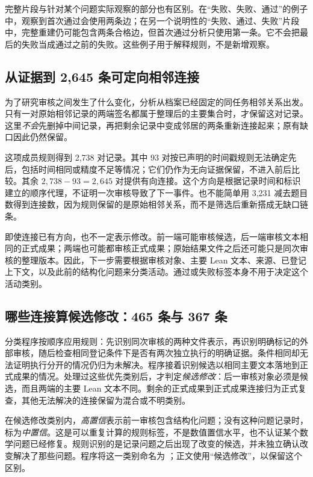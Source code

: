 完整片段与针对某个问题实际观察的部分也有区别。在“失败、失败、通过”的例子中，观察到首次通过会使用两条边；在另一个说明性的“失败、通过、失败”片段中，完整重建仍可能包含两条合格边，但首次通过分析只使用第一条。它不会把最后的失败当成通过之前的失败。这些例子用于解释规则，不是新增观察。

\subsection{从证据到 2,645 条可定向相邻连接}
\label{subsec:adjacency}
为了研究审核之间发生了什么变化，分析从档案已经固定的同任务相邻关系出发。只有一对原始相邻记录的两端签名都属于整理后的主要集合时，才保留这对记录。这里\emph{不会}先删掉中间记录，再把剩余记录中变成邻居的两条重新连接起来；原有缺口因此仍然保留。

这项成员规则得到 2,738 对记录。其中 93 对按已声明的时间戳规则无法确定先后，包括时间相同或精度不足等情况；它们仍作为无向证据保留，不进入前后比较。其余 $2,738-93=2,645$ 对提供有向连接。这个方向是根据记录时间和标识建立的顺序代理，不证明一次审核导致了下一事件。也不能简单用 3,231 减去题目数得到连接数，因为规则保留的是原始相邻关系，而不是筛选后重新搭成无缺口链条。

即使连接已有方向，也不一定表示修改。前一端可能审核候选，后一端审核文本相同的正式成果；两端也可能都审核正式成果；原始结果文件之后还可能只是同次审核的整理版本。因此，下一步需要根据审核对象、主要 Lean 文本、来源、已登记上下文，以及此前的结构化问题来分类活动。通过或失败标签本身不用于决定这个活动类别。

\subsection{哪些连接算候选修改：465 条与 367 条}
\label{subsec:revision-rule}
分类程序按顺序应用规则：先识别同次审核的两种文件表示，再识别明确标记的外部审核，随后检查相同登记条件下是否有两次独立执行的明确证据。条件相同却无法证明执行分开的情况仍归为未解决。程序接着识别候选以相同主要文本落地到正式成果的情况。处理过这些优先类别后，才判定\emph{候选修改}：后一审核对象必须是候选，而且两端的主要 Lean 文本不同。剩余的正式成果到正式成果连接归为正式复查，其他无法解决的连接保留为混合或不明类别。

在候选修改类别内，\emph{高置信}表示前一审核包含结构化问题；没有这种问题记录时，标为\emph{中置信}。这是可以重复计算的规则标签，不是数值置信水平，也不认证某个数学问题已经修复。规则识别的是记录问题之后出现了改变的候选，并未独立确认改变解决了那些问题。程序将这一类别命名为 ；正文使用“候选修改”，以保留这个区别。

